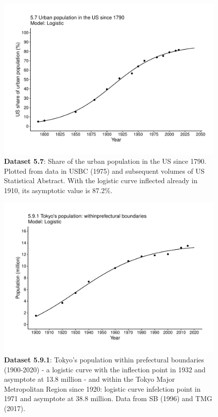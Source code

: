 \documentclass[aps,rmp,preprint,superscriptaddress,10pt,onecolumn]{article}
\begin{document}
\clearpage
\begin{figure}[h]
\includegraphics[width=\textwidth]{output/figs-ggplot/5.7.pdf}
\caption{\textbf{Dataset 5.7}: Share of the urban population in the US since 1790. Plotted from data in USBC (1975) and subsequent volumes of US Statistical Abstract. With the logistic curve inflected already in 1910, its asymptotic value is 87.2\%.}
\end{figure}
	
\clearpage
\begin{figure}[h]
\includegraphics[width=\textwidth]{output/figs-ggplot/5.9.1.pdf}
\caption{\textbf{Dataset 5.9.1}: Tokyo's population within prefectural boundaries (1900-2020) - a logistic curve with the inflection point in 1932 and asymptote at 13.8 million - and within the Tokyo Major Metropolitan Region since 1920: logistic curve infelction point in 1971 and asymptote at 38.8 million. Data from SB (1996) and TMG (2017). }
\end{figure}
	
\end{document}

